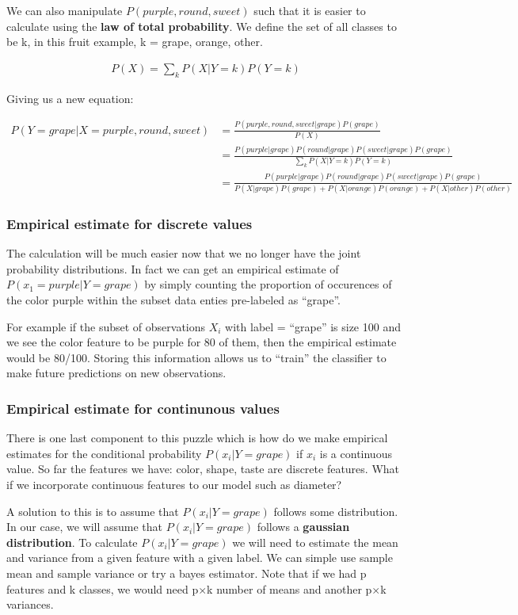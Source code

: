 \documentclass{article}
\begin{document}
We can also manipulate $P(purple,round,sweet)$ such that it is easier to calculate using the \textbf{law of total probability}. We define the set of all classes to be k, in this fruit example, k = {grape, orange, other}. 

\begin{align*}
P(X) = \sum_{k} P(X|Y=k)P(Y=k)
\end{align*}

Giving us a new equation:

\begin{align*}
P(Y=grape|X=purple,round,sweet)&= \frac{P(purple,round,sweet|grape)P(grape)}{P(X)}\\
&= \frac{P(purple|grape)P(round|grape)P(sweet|grape)P(grape)}{\sum_{k} P(X|Y=k)P(Y=k)}\\
&= \frac{P(purple|grape)P(round|grape)P(sweet|grape)P(grape)}{P(X|grape)P(grape)+P(X|orange)P(orange)+P(X|other)P(other)}
\end{align*}

\subsubsection{Empirical estimate for discrete values}
The calculation will be much easier now that we no longer have the joint probability distributions. In fact we can get an empirical estimate of $P(x_{1} = purple|Y=grape)$ by simply counting the proportion of occurences of the color purple within the subset data enties pre-labeled as ``grape''.\newline

For example if the subset of observations $X_{i}$ with label = ``grape'' is size 100 and we see the color feature to be purple for 80 of them, then the empirical estimate would be 80/100. Storing this information allows us to ``train'' the classifier to make future predictions on new observations. 
\subsubsection{Empirical estimate for continunous values}
There is one last component to this puzzle which is how do we make empirical estimates for the conditional probability $P(x_{i}|Y=grape)$ if $x_{i}$ is a continuous value. So far the features we have: color, shape, taste are discrete features. What if we incorporate continuous features to our model such as diameter?\newline

A solution to this is to assume that $P(x_{i}|Y=grape)$ follows some distribution. In our case, we will assume that $P(x_{i}|Y=grape)$ follows a \textbf{gaussian distribution}. To calculate $P(x_{i}|Y=grape)$ we will need to estimate the mean and variance from a given feature with a given label. We can simple use sample mean and sample variance or try a bayes estimator. Note that if we had p features and k classes, we would need p$\times$k number of means and another p$\times$k variances.\newline
\end{document}
